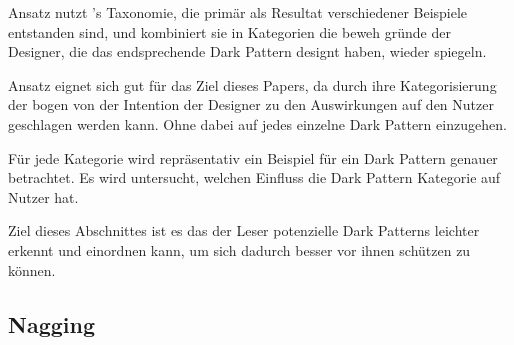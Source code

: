 \documentclass[conference,compsoc,final,a4paper]{IEEEtran}
\begin{document}
\citeauthor{Gray_2018} Ansatz nutzt \citeauthor{Brignull}'s Taxonomie, die primär als Resultat verschiedener Beispiele entstanden sind, und kombiniert sie in Kategorien die beweh gründe der Designer, die das endsprechende Dark Pattern designt haben, wieder spiegeln.

\citeauthor{Gray_2018} Ansatz eignet sich gut für das Ziel dieses Papers, da durch ihre Kategorisierung der bogen von der Intention der Designer zu den Auswirkungen auf den Nutzer geschlagen werden kann. Ohne dabei auf jedes einzelne Dark Pattern einzugehen.

Für jede Kategorie wird repräsentativ ein Beispiel für ein Dark Pattern genauer betrachtet. Es wird untersucht, welchen Einfluss die Dark Pattern Kategorie auf Nutzer hat.

Ziel dieses Abschnittes ist es das der Leser potenzielle Dark Patterns leichter erkennt und einordnen kann, um sich dadurch besser vor ihnen schützen zu können.


\subsection{Nagging}
\end{document}
